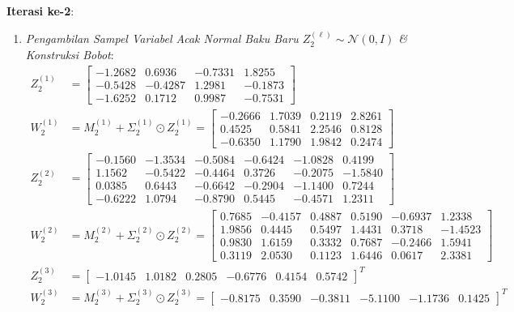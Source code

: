 \documentclass[11pt,a4paper]{article}
\theoremstyle{plain}
\theoremstyle{definition}
\theoremstyle{remark}
\begin{document}
\noindent \textbf{Iterasi ke-2}:
\begin{enumerate}
    \item \textit{Pengambilan Sampel Variabel Acak Normal Baku Baru $Z^{(\ell)}_2 \sim \mathcal{N}(0, I)$ \& Konstruksi Bobot}:
    \begin{align}
        Z^{(1)}_2 &= \begin{bmatrix}
            -1.2682 &  0.6936 & -0.7331 &  1.8255 \\
            -0.5428 & -0.4287 &  1.2981 & -0.1873 \\
            -1.6252 &  0.1712 &  0.9987 & -0.7531
        \end{bmatrix} \\[0.2em]
        W^{(1)}_2 &= M^{(1)}_2 + \Sigma^{(1)}_2 \odot Z^{(1)}_2 = \begin{bmatrix}
            -0.2666 & 1.7039 & 0.2119 & 2.8261 \\
             0.4525 & 0.5841 & 2.2546 & 0.8128 \\
            -0.6350 & 1.1790 & 1.9842 & 0.2474
        \end{bmatrix} \\[0.2em]
        Z^{(2)}_2 &= \begin{bmatrix}
            -0.1560 & -1.3534 & -0.5084 & -0.6424 & -1.0828 &  0.4199 \\
             1.1562 & -0.5422 & -0.4464 &  0.3726 & -0.2075 & -1.5840 \\
             0.0385 &  0.6443 & -0.6642 & -0.2904 & -1.1400 &  0.7244 \\
            -0.6222 &  1.0794 & -0.8790 &  0.5445 & -0.4571 &  1.2311
        \end{bmatrix} \\[0.2em]
        W^{(2)}_2 &= M^{(2)}_2 + \Sigma^{(2)}_2 \odot Z^{(2)}_2 = \begin{bmatrix}
            0.7685 & -0.4157 & 0.4887 & 0.5190 & -0.6937 &  1.2338 \\
            1.9856 &  0.4445 & 0.5497 & 1.4431 &  0.3718 & -1.4523 \\
            0.9830 &  1.6159 & 0.3332 & 0.7687 & -0.2466 &  1.5941 \\
            0.3119 &  2.0530 & 0.1123 & 1.6446 &  0.0617 &  2.3381
        \end{bmatrix} \\[0.2em]
        Z^{(3)}_2 &= \begin{bmatrix} -1.0145 & 1.0182 & 0.2805 & -0.6776 & 0.4154 & 0.5742 \end{bmatrix}^T \\[0.2em]
        W^{(3)}_2 &= M^{(3)}_2 + \Sigma^{(3)}_2 \odot Z^{(3)}_2 = \begin{bmatrix} -0.8175 & 0.3590 & -0.3811 & -5.1100 & -1.1736 & 0.1425 \end{bmatrix}^T
    \end{align}


\end{enumerate}
\end{document}
